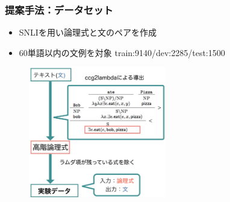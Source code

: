 \documentclass[dvipdfmx]{beamer}
\begin{document}
\begin{frame}
\frametitle{提案手法：データセット}
\begin{itemize}
  \item
SNLIを用い論理式と文のペアを作成

\item 60単語以内の文例を対象
train:9140/dev:2285/test:1500\\

\end{itemize}
\begin{center}
\begin{figure}[h]
	\includegraphics[width=6cm]{edit_data.png}
        \label{fig:editdata}
\end{figure}
\end{center}

\end{frame}
\end{document}
